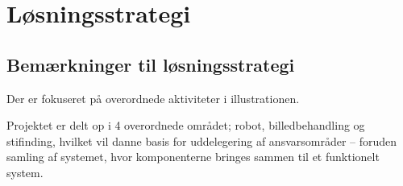 \section{Løsningsstrategi}
\subsection{Bemærkninger til løsningsstrategi}
Der er fokuseret på overordnede aktiviteter i illustrationen.

Projektet er delt op i 4 overordnede området; robot, billedbehandling og stifinding, hvilket vil danne basis for uddelegering af ansvarsområder -- foruden samling af systemet, hvor komponenterne bringes sammen til et funktionelt system.

